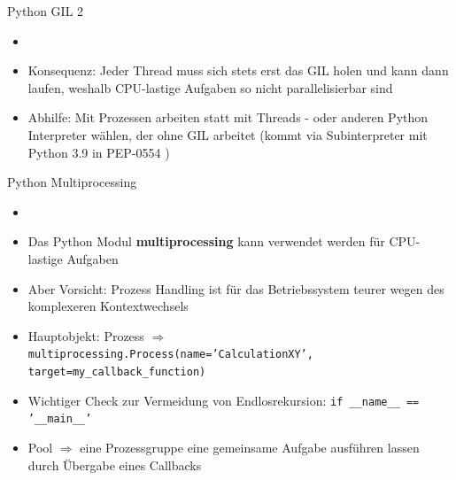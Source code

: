 \begin{frame}{Python GIL 2}
                 \begin{itemize}
        \setlength{\itemindent}{1.0in}
        \item [\textbf{Was heißt das? }]
    \end{itemize}
    \begin{itemize}
        \item Konsequenz:  Jeder Thread muss sich stets erst das GIL holen und kann dann laufen, weshalb CPU-lastige Aufgaben so nicht parallelisierbar sind
         \item Abhilfe:  Mit Prozessen arbeiten statt mit Threads - oder anderen Python Interpreter wählen, der ohne GIL arbeitet (kommt via Subinterpreter mit Python 3.9 in PEP-0554 \cite{python.org/dev/peps/pep-0554})
    \end{itemize}

    \end{frame}

\begin{frame}{Python Multiprocessing}
          \begin{itemize}
        \setlength{\itemindent}{1.4in}
        \item [\textbf{Multiprocessing Modul}]
    \end{itemize}
    \begin{itemize}
        \item Das Python Modul \textbf{multiprocessing} kann verwendet werden für CPU-lastige Aufgaben
        \item Aber Vorsicht: Prozess Handling ist für das Betriebssystem teurer wegen des komplexeren Kontextwechsels
        \item Hauptobjekt: Prozess $\Rightarrow$   \texttt{multiprocessing.Process(name='CalculationXY', target=my\_callback\_function)}
        \item Wichtiger Check zur Vermeidung von Endlosrekursion:   \texttt{if \_\_name\_\_ == '\_\_main\_\_'}
        \item Pool $\Rightarrow$ eine Prozessgruppe eine gemeinsame Aufgabe ausführen lassen durch Übergabe eines Callbacks
    \end{itemize}
\end{frame}

